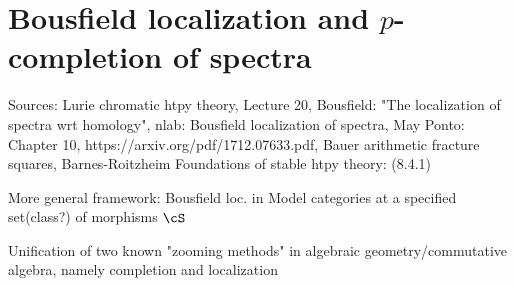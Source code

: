 \chapter{Bousfield localization and $p$-completion of spectra}
Sources: Lurie chromatic htpy theory, Lecture 20, Bousfield: "The localization of spectra wrt homology", nlab: Bousfield localization of spectra, May Ponto: Chapter 10, https://arxiv.org/pdf/1712.07633.pdf, Bauer arithmetic fracture squares, 
Barnes-Roitzheim Foundations of stable htpy theory: (8.4.1)
\bi
\item More general framework: Bousfield loc. in Model categories at a specified set(class?) of morphisms $\cS$ 
\item Unification of two known "zooming methods" in algebraic geometry/commutative algebra, namely completion and localization
\ei

